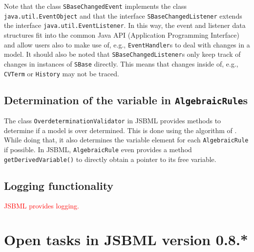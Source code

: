 \documentclass[
  BCOR12mm,
  letterpaper,
  11pt,
  headsepline,
  pointlessnumbers,
  tablecaptionabove,
  onelinecaption,
  headinclude,
  appendixprefix,
  idxtotoc,
  bibtotoc,
  twoside,
  titlepage
]{scrartcl}
\begin{document}
Note that the class \texttt{SBaseChangedEvent} implements the class
\texttt{java.util.EventObject} and that the interface
\texttt{SBaseChangedListener} extends the interface
\texttt{java.util.EventListener}. In this way, the event and listener data
structures fit into the common Java API (Application Programming Interface) and
allow users also to make use of, e.g., \texttt{EventHandler}s to deal with
changes in a model. It should also be noted that \texttt{SBaseChangedListener}s
only keep track of changes in instances of \texttt{SBase} directly. This means
that changes inside of, e.g., \texttt{CVTerm} or \texttt{History} may not be
traced.

\subsection{Determination of the variable in \texttt{AlgebraicRule}s}

The class \texttt{OverdeterminationValidator}
 in JSBML provides methods to
determine if a model
is over determined. This is done using the algorithm of \citet{Hopcroft1973}.
While doing that, it also determines the variable element for each
\texttt{AlgebraicRule} if
possible. In JSBML, \texttt{AlgebraicRule} even provides a method
\texttt{getDerivedVariable()} to directly obtain a pointer to its free variable.


\subsection{Logging functionality}

\textcolor{red}{JSBML provides logging.}

\section{Open tasks in JSBML version 0.8.*}
\end{document}
